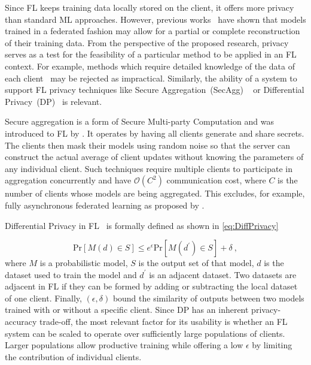 Since FL keeps training data locally stored on the client, it offers more privacy than standard ML approaches. However, previous works~\citep{InvertingGradients,ProtectionAgainstReconstructionAndItsApplicationsInPrivateFL,PrivacyPreservingDLAdditivelyHomo,DeepLeakage} have shown that models trained in a federated fashion may allow for a partial or complete reconstruction of their training data. From the perspective of the proposed research, privacy serves as a test for the feasibility of a particular method to be applied in an FL context. For example, methods which require detailed knowledge of the data of each client~\citep{FLwithNonIID, OptimalUserEdgeAssingmentHierFL,FedHOME,CommEffDistillation} may be rejected as impractical. Similarly, the ability of a system to support FL privacy techniques like Secure Aggregation~(SecAgg) ~\citep{SecAggOG,FastSecAgg,LightSecAgg} or Differential Privacy~(DP)~\citep{DiffPrivacyOriginal,DiffPrivacyFL,LearningDifferentiallyPrivateRNNs,TowardsFairPrivacyPreservingFL,PracticalPrivateFLkairouz21b} is relevant.

Secure aggregation is a form of Secure Multi-party Computation and was introduced to FL by \citet{SecAggOG}. It operates by having all clients generate and share secrets. The clients then mask their models using random noise so that the server can construct the actual average of client updates without knowing the parameters of any individual client. Such techniques require multiple clients to participate in aggregation concurrently and have $\mathcal{O}(C^2)$ communication cost, where $C$ is the number of clients whose models are being aggregated. This excludes, for example, fully asynchronous federated learning as proposed by \citet{AsyncFedOpt}.

Differential Privacy in FL~\citep{LearningDifferentiallyPrivateRNNs} is formally defined as shown in \cref{eq:DiffPrivacy}

\begin{equation}\label{eq:DiffPrivacy}
    \mathrm{Pr}[M(d) \in S] \leq e^\epsilon \mathrm{Pr}[M(d^\prime) \in S] + \delta \ ,
\end{equation}
where $M$ is a probabilistic model, $S$ is the output set of that model, $d$ is the dataset used to train the model and $d^\prime$ is an adjacent dataset. Two datasets are adjacent in FL if they can be formed by adding or subtracting the local dataset of one client.  Finally, $(\epsilon,\delta)$ bound the similarity of outputs between two models trained with or without a specific client. Since DP has an inherent privacy-accuracy trade-off, the most relevant factor for its usability is whether an FL system can be scaled to operate over sufficiently large populations of clients. Larger populations allow productive training while offering a low $\epsilon$ by limiting the contribution of individual clients.

